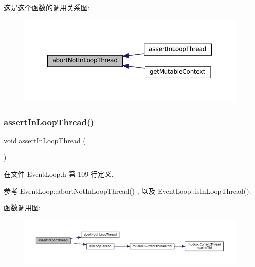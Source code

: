 这是这个函数的调用关系图\+:
\nopagebreak
\begin{figure}[H]
\begin{center}
\leavevmode
\includegraphics[width=350pt]{classmuduo_1_1net_1_1EventLoop_a6375a5e33170fe1ee0fcb82c68b684ba_icgraph}
\end{center}
\end{figure}
\mbox{\label{classmuduo_1_1net_1_1EventLoop_a9e9c23193ece3ba25a1a2779fc7ebc2d}} 
\subsubsection{\texorpdfstring{assert\+In\+Loop\+Thread()}{assertInLoopThread()}}
{\footnotesize\ttfamily void assert\+In\+Loop\+Thread (\begin{DoxyParamCaption}{ }\end{DoxyParamCaption})\hspace{0.3cm}{\ttfamily [inline]}}



在文件 Event\+Loop.\+h 第 109 行定义.



参考 Event\+Loop\+::abort\+Not\+In\+Loop\+Thread() , 以及 Event\+Loop\+::is\+In\+Loop\+Thread().

函数调用图\+:
\nopagebreak
\begin{figure}[H]
\begin{center}
\leavevmode
\includegraphics[width=350pt]{classmuduo_1_1net_1_1EventLoop_a9e9c23193ece3ba25a1a2779fc7ebc2d_cgraph}
\end{center}
\end{figure}
\mbox{\label{classmuduo_1_1net_1_1EventLoop_af8b24b02bbff6a657fa5b0190bef9b9b}} 

